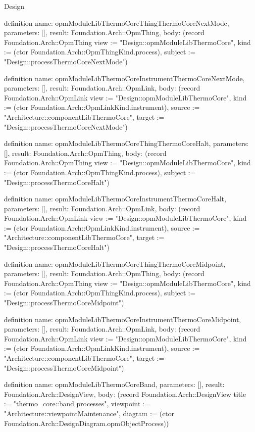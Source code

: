 \begin{lexlean}{Design}
\begin{semanticmodule}
definition{
  name: opmModuleLibThermoCoreThingThermoCoreNextMode,
  parameters: [],
  result: Foundation.Arch::OpmThing,
  body: (record Foundation.Arch::OpmThing {view := "Design::opmModuleLibThermoCore", kind := (ctor Foundation.Arch::OpmThingKind.process), subject := "Design::processThermoCoreNextMode"})
}

definition{
  name: opmModuleLibThermoCoreInstrumentThermoCoreNextMode,
  parameters: [],
  result: Foundation.Arch::OpmLink,
  body: (record Foundation.Arch::OpmLink {view := "Design::opmModuleLibThermoCore", kind := (ctor Foundation.Arch::OpmLinkKind.instrument), source := "Architecture::componentLibThermoCore", target := "Design::processThermoCoreNextMode"})
}

definition{
  name: opmModuleLibThermoCoreThingThermoCoreHalt,
  parameters: [],
  result: Foundation.Arch::OpmThing,
  body: (record Foundation.Arch::OpmThing {view := "Design::opmModuleLibThermoCore", kind := (ctor Foundation.Arch::OpmThingKind.process), subject := "Design::processThermoCoreHalt"})
}

definition{
  name: opmModuleLibThermoCoreInstrumentThermoCoreHalt,
  parameters: [],
  result: Foundation.Arch::OpmLink,
  body: (record Foundation.Arch::OpmLink {view := "Design::opmModuleLibThermoCore", kind := (ctor Foundation.Arch::OpmLinkKind.instrument), source := "Architecture::componentLibThermoCore", target := "Design::processThermoCoreHalt"})
}

definition{
  name: opmModuleLibThermoCoreThingThermoCoreMidpoint,
  parameters: [],
  result: Foundation.Arch::OpmThing,
  body: (record Foundation.Arch::OpmThing {view := "Design::opmModuleLibThermoCore", kind := (ctor Foundation.Arch::OpmThingKind.process), subject := "Design::processThermoCoreMidpoint"})
}

definition{
  name: opmModuleLibThermoCoreInstrumentThermoCoreMidpoint,
  parameters: [],
  result: Foundation.Arch::OpmLink,
  body: (record Foundation.Arch::OpmLink {view := "Design::opmModuleLibThermoCore", kind := (ctor Foundation.Arch::OpmLinkKind.instrument), source := "Architecture::componentLibThermoCore", target := "Design::processThermoCoreMidpoint"})
}

definition{
  name: opmModuleLibThermoCoreBand,
  parameters: [],
  result: Foundation.Arch::DesignView,
  body: (record Foundation.Arch::DesignView {title := "thermo_core::band processes", viewpoint := "Architecture::viewpointMaintenance", diagram := (ctor Foundation.Arch::DesignDiagram.opmObjectProcess)})
}


\end{semanticmodule}
\end{lexlean}
